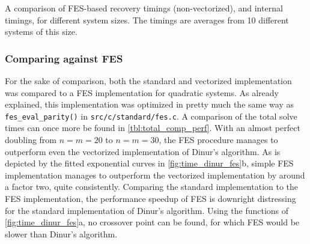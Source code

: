 \begin{table}[t]
    \begin{center}
    \end{center}
    \caption{A comparison of FES-based recovery timings (non-vectorized), and internal timings, for different system sizes. The timings are averages from 10 different systems of this size.} \label{tbl:fes_comp_perf}
\end{table}

\subsubsection{Comparing against FES}

For the sake of comparison, both the standard and vectorized implementation was compared to a FES implementation for quadratic systems. As already explained, this implementation was optimized in pretty much the same way as \texttt{fes\_eval\_parity()} in \texttt{src/c/standard/fes.c}. A comparison of the total solve times can once more be found in \cref{tbl:total_comp_perf}. With an almost perfect doubling from $n = m = 20$ to $n = m = 30$, the FES procedure manages to outperform even the vectorized implementation of Dinur's algorithm. As is depicted by the fitted exponential curves in \cref{fig:time_dinur_fes}b, simple FES implementation manages to outperform the vectorized implementation by around a factor two, quite consistently. Comparing the standard implementation to the FES implementation, the performance speedup of FES is downright distressing for the standard implementation of Dinur's algorithm. Using the functions of \cref{fig:time_dinur_fes}a, no crossover point can be found, for which FES would be slower than Dinur's algorithm.


